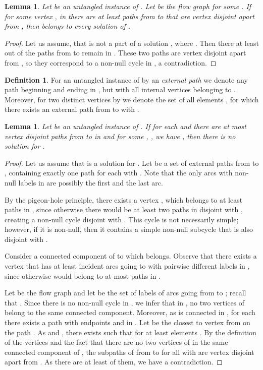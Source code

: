 \documentclass[11pt]{article}
\newtheorem{lemma}[theorem]{Lemma}
\theoremstyle{definition}
\newtheorem{definition}[theorem]{Definition}
\newcommand{\cgfvsshort}{{\sc{C-GFVS}}\xspace}
\begin{document}
\begin{lemma}
\label{red:1}
Let  be an untangled instance of \cgfvsshort.
Let  be the flow graph  for some .
If for some vertex , 
in  there are at least  paths from  to  that are vertex disjoint apart from ,
then  belongs to every solution of \cgfvsshort.
\end{lemma}

\begin{proof}
Let us assume, that  is not a part of a solution ,
where .
Then there at least  out of the  paths from  to  remain in .
These two paths are vertex disjoint apart from , so they correspond to a non-null cycle in , a contradiction.
\end{proof}

\begin{definition}
For an untangled instance  of \cgfvsshort by an {\em external path}
we denote any path  beginning and ending in , but with all internal vertices belonging to .
Moreover, for two distinct vertices  by  we denote the set of all elements ,
for which there exists an external path  from  to  with .
\end{definition}

\begin{lemma}
\label{lem:many_paths}
Let  be an untangled instance of \cgfvsshort.
If for each  and 
there are at most  vertex disjoint paths from 
to  in 
and for some , , we have , 
then there is no solution for .
\end{lemma}

\begin{proof}
Let us assume that  is a solution for .
Let  be a set of external paths from  to ,
containing exactly one path  for each  with .
Note that the only arcs with non-null labels in  are possibly the first and the last arc.

By the pigeon-hole principle, there exists a vertex ,
which belongs to at least  paths in ,
since otherwise there would be at least two paths in 
disjoint with , creating a non-null cycle disjoint with . This cycle is not necessarily simple; however, if it is non-null, then it contains a simple non-null subcycle that is also disjoint with .

Consider a connected component  of  to which  belongs.
Observe that there exists a vertex 
that has at least  incident arcs
going to  with pairwise different labels in ,
since otherwise  would belong to at most  paths in .

Let  be the flow graph 
and let  be the set of labels of arcs going from  to ; recall that .
Since there is no non-null cycle in , 
we infer that in , 
no two vertices of  belong to the same connected component.
Moreover, as  is connected in , for each  there exists a path  with endpoints  and  in .
Let  be the closest to  vertex from  on the path . As  and ,
there exists  such that  for at least  elements .
By the definition of the vertices  and the fact that there are no two vertices of  in the same connected component of ,
the subpaths of  from  to  for all  with  are vertex disjoint apart from .
As there are at least  of them, we have a contradiction.
\end{proof}
\end{document}
